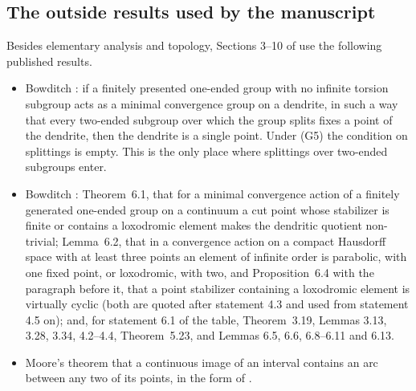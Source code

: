 \documentclass[11pt,a4paper]{article}
\theoremstyle{definition}
\theoremstyle{remark}
\begin{document}
\subsection{The outside results used by the manuscript}
Besides elementary analysis and topology, Sections 3--10 of \cite{O} use the
following published results.
\begin{itemize}
\item Bowditch \cite[Lemma~1.4]{BoC}: if a finitely presented one-ended group with no
infinite torsion subgroup acts as a minimal convergence group on a dendrite,
in such a way that every two-ended subgroup over which the group splits fixes a
point of the dendrite, then the dendrite is a single point. Under (G5) the condition on
splittings is empty. This is the only place where splittings over two-ended
subgroups enter.
\item Bowditch \cite{BoT}: Theorem~6.1, that for a minimal convergence action of a
finitely generated one-ended group on a
continuum a cut point whose stabilizer is finite or contains a loxodromic
element makes the dendritic quotient non-trivial; Lemma~6.2, that in a
convergence action on a compact Hausdorff space with at least three points an
element of infinite order is parabolic, with one fixed point, or loxodromic,
with two, and Proposition~6.4 with the paragraph before it, that a point
stabilizer containing a loxodromic element is virtually cyclic (both are quoted
after statement 4.3 and used from statement 4.5 on); and, for statement 6.1 of
the table, Theorem~3.19, Lemmas 3.13, 3.28, 3.34,
4.2--4.4, Theorem~5.23, and Lemmas 6.5, 6.6, 6.8--6.11 and 6.13.
\item Moore's theorem that a continuous image of an interval contains an arc
between any two of its points, in the form of \cite{K}.
\end{itemize}
\end{document}
